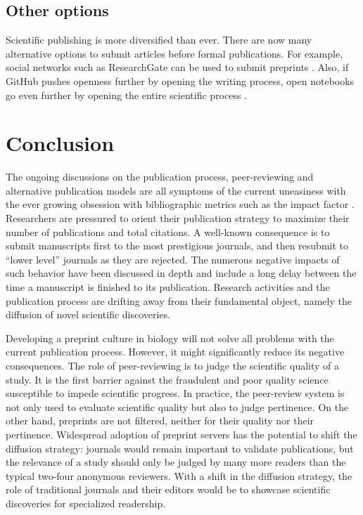 \documentclass[10pt]{article}
\begin{document}
\subsection*{Other options}

Scientific publishing is more diversified than ever. There are now many 
alternative options to submit articles before formal publications. For 
example, social networks such as ResearchGate can be used to submit 
preprints \cite{lin12}. Also, if GitHub pushes openness further by opening 
the writing process, open notebooks go even further by opening the entire 
scientific process \cite{san11}. 

\section*{Conclusion}

The ongoing discussions on the publication process, peer-reviewing and 
alternative publication models are all symptoms of the current uneasiness 
with the ever growing obsession with bibliographic metrics such as the 
impact factor \cite{Fisher2012}. Researchers are pressured to orient their 
publication strategy to maximize their number of publications and total 
citations. A well-known consequence is to submit manuscripts first to the 
most prestigious journals, and then resubmit to ``lower level'' journals as 
they are rejected. The numerous negative impacts of such behavior have been 
discussed in depth \cite{hoc09} and include a long delay between the time a 
manuscript is finished to its publication. Research activities and the 
publication process are drifting away from their fundamental object, namely 
the diffusion of novel scientific discoveries. 

Developing a preprint culture in biology will not solve all problems with 
the current publication process. However, it might significantly reduce its 
negative consequences. The role of peer-reviewing is to judge the scientific 
quality of a study. It is the first barrier against the fraudulent and poor 
quality science susceptible to impede scientific progress. In practice, the 
peer-review system is not only used to evaluate scientific quality but also 
to judge pertinence. On the other hand, preprints are not filtered, neither 
for their quality nor their pertinence. Widespread adoption of preprint 
servers has the potential to shift the diffusion strategy: journals would 
remain important to validate publications, but the relevance of a study 
should only be judged by many more readers than the typical two-four 
anonymous reviewers. With a shift in the diffusion strategy, the role of 
traditional journals and their editors would be to showcase scientific 
discoveries for specialized readership. 
\end{document}
